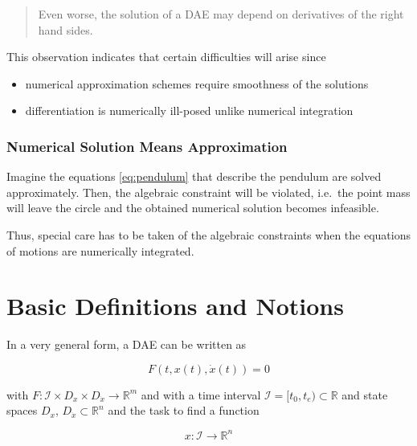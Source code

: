\documentclass[]{book}
\providecommand{\tightlist}{%
  \setlength{\itemsep}{0pt}\setlength{\parskip}{0pt}}
\newenvironment {JHSAYS} [0] {\begin{quote}\color{jhsc}} {\end{quote}}
\theoremstyle{definition}
\theoremstyle{definition}
\theoremstyle{definition}
\theoremstyle{definition}
\theoremstyle{remark}
\begin{document}
\begin{JHSAYS}
Even worse, the solution of a DAE may depend on derivatives of the right
hand sides.
\end{JHSAYS}

This observation indicates that certain difficulties will arise since

\begin{itemize}
\tightlist
\item
  numerical approximation schemes require smoothness of the solutions
\item
  differentiation is numerically ill-posed unlike numerical integration
\end{itemize}

\hypertarget{numerical-solution-means-approximation}{%
\subsection*{Numerical Solution Means Approximation}\label{numerical-solution-means-approximation}}

Imagine the equations \eqref{eq:pendulum} that describe the pendulum are solved approximately. Then, the algebraic constraint will be violated, i.e.~the point mass will leave the circle and the obtained numerical solution becomes infeasible.

Thus, special care has to be taken of the algebraic constraints when the equations of motions are numerically integrated.

\hypertarget{basic-definitions-and-notions}{%
\chapter{Basic Definitions and Notions}\label{basic-definitions-and-notions}}

In a very general form, a DAE can be written as

\begin{equation}
    F(t, x(t), \dot x(t)) = 0
    \label{eq:gendae}
\end{equation}

with \(F\colon \mathcal I \times D_x \times D_{\dot x} \to \mathbb R^m\) and with a time interval \(\mathcal I=[t_0,t_e) \subset \mathbb R\) and state spaces \(D_x\), \(D_{\dot x} \subset \mathbb R^{n}\) and the task to find a function

\begin{equation*}
    x \colon \mathcal I \to \mathbb R^{n}
\end{equation*}
\end{document}
